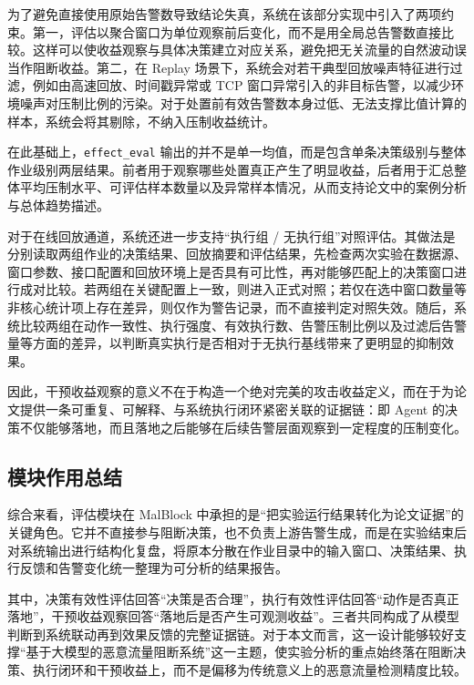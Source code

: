 为了避免直接使用原始告警数导致结论失真，系统在该部分实现中引入了两项约束。第一，评估以聚合窗口为单位观察前后变化，而不是用全局总告警数直接比较。这样可以使收益观察与具体决策建立对应关系，避免把无关流量的自然波动误当作阻断收益。第二，在 Replay 场景下，系统会对若干典型回放噪声特征进行过滤，例如由高速回放、时间戳异常或 TCP 窗口异常引入的非目标告警，以减少环境噪声对压制比例的污染。对于处置前有效告警数本身过低、无法支撑比值计算的样本，系统会将其剔除，不纳入压制收益统计。

在此基础上，\texttt{effect\_eval} 输出的并不是单一均值，而是包含单条决策级别与整体作业级别两层结果。前者用于观察哪些处置真正产生了明显收益，后者用于汇总整体平均压制水平、可评估样本数量以及异常样本情况，从而支持论文中的案例分析与总体趋势描述。

对于在线回放通道，系统还进一步支持``执行组 / 无执行组''对照评估。其做法是分别读取两组作业的决策结果、回放摘要和评估结果，先检查两次实验在数据源、窗口参数、接口配置和回放环境上是否具有可比性，再对能够匹配上的决策窗口进行成对比较。若两组在关键配置上一致，则进入正式对照；若仅在选中窗口数量等非核心统计项上存在差异，则仅作为警告记录，而不直接判定对照失效。随后，系统比较两组在动作一致性、执行强度、有效执行数、告警压制比例以及过滤后告警量等方面的差异，以判断真实执行是否相对于无执行基线带来了更明显的抑制效果。

因此，干预收益观察的意义不在于构造一个绝对完美的攻击收益定义，而在于为论文提供一条可重复、可解释、与系统执行闭环紧密关联的证据链：即 Agent 的决策不仅能够落地，而且落地之后能够在后续告警层面观察到一定程度的压制变化。

\subsection{模块作用总结}\label{subsec:evaluation__summary}

综合来看，评估模块在 MalBlock 中承担的是``把实验运行结果转化为论文证据''的关键角色。它并不直接参与阻断决策，也不负责上游告警生成，而是在实验结束后对系统输出进行结构化复盘，将原本分散在作业目录中的输入窗口、决策结果、执行反馈和告警变化统一整理为可分析的结果报告。

其中，决策有效性评估回答``决策是否合理''，执行有效性评估回答``动作是否真正落地''，干预收益观察回答``落地后是否产生可观测收益''。三者共同构成了从模型判断到系统联动再到效果反馈的完整证据链。对于本文而言，这一设计能够较好支撑``基于大模型的恶意流量阻断系统''这一主题，使实验分析的重点始终落在阻断决策、执行闭环和干预收益上，而不是偏移为传统意义上的恶意流量检测精度比较。
